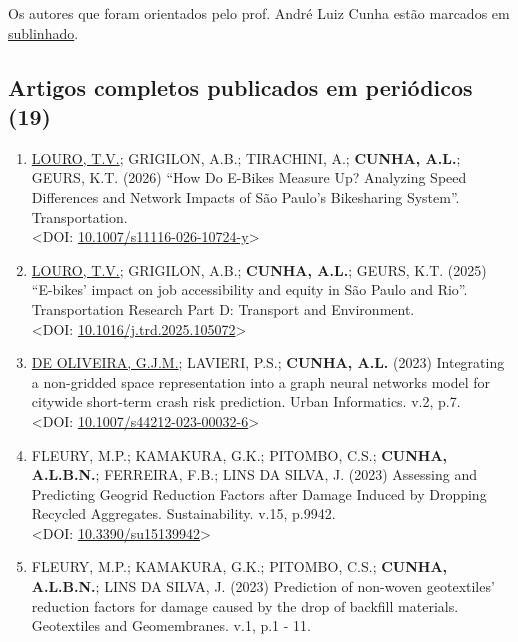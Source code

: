 \documentclass[
  brazilian,
  11pt,
  a4paper,
]{article}
\begin{document}
Os autores que foram orientados pelo prof. André Luiz Cunha estão
marcados em \ul{sublinhado}.

\subsection{Artigos completos publicados em periódicos
(19)}\label{artigos-completos-publicados-em-periuxf3dicos-19}

\begin{enumerate}
\def\labelenumi{\arabic{enumi}.}
\item
  \ul{LOURO, T.V.}; GRIGILON, A.B.; TIRACHINI, A.; \textbf{CUNHA, A.L.};
  GEURS, K.T. (2026) ``How Do E-Bikes Measure Up? Analyzing Speed
  Differences and Network Impacts of São Paulo's Bikesharing System''.
  Transportation.\\
  \textless DOI:
  \href{https://doi.org/10.1007/s11116-026-10724-y}{10.1007/s11116-026-10724-y}\textgreater{}
\item
  \ul{LOURO, T.V.}; GRIGILON, A.B.; \textbf{CUNHA, A.L.}; GEURS, K.T.
  (2025) ``E-bikes' impact on job accessibility and equity in São Paulo
  and Rio''. Transportation Research Part D: Transport and
  Environment.\\
  \textless DOI:
  \href{https://doi.org/10.1016/j.trd.2025.105072}{10.1016/j.trd.2025.105072}\textgreater{}
\item
  \ul{DE OLIVEIRA, G.J.M.}; LAVIERI, P.S.; \textbf{CUNHA, A.L.} (2023)
  Integrating a non-gridded space representation into a graph neural
  networks model for citywide short-term crash risk prediction. Urban
  Informatics. v.2, p.7.\\
  \textless DOI:
  \href{https://doi.org/10.1007/s44212-023-00032-6}{10.1007/s44212-023-00032-6}\textgreater{}
\item
  FLEURY, M.P.; KAMAKURA, G.K.; PITOMBO, C.S.; \textbf{CUNHA, A.L.B.N.};
  FERREIRA, F.B.; LINS DA SILVA, J. (2023) Assessing and Predicting
  Geogrid Reduction Factors after Damage Induced by Dropping Recycled
  Aggregates. Sustainability. v.15, p.9942.\\
  \textless DOI:
  \href{https://doi.org/10.3390/su15139942}{10.3390/su15139942}\textgreater{}
\item
  FLEURY, M.P.; KAMAKURA, G.K.; PITOMBO, C.S.; \textbf{CUNHA, A.L.B.N.};
  LINS DA SILVA, J. (2023) Prediction of non-woven geotextiles'
  reduction factors for damage caused by the drop of backfill materials.
  Geotextiles and Geomembranes. v.1, p.1 - 11.\\

\end{enumerate}
\end{document}
